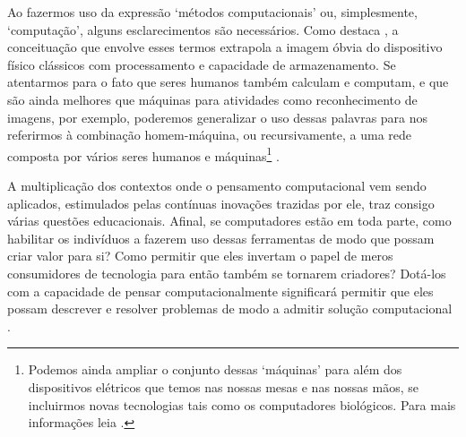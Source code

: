 
Ao fazermos uso da expressão `métodos computacionais' ou, simplesmente, `computação', alguns esclarecimentos são necessários. Como destaca , a conceituação que envolve esses termos extrapola a imagem óbvia do dispositivo físico clássicos com processamento e capacidade de armazenamento. Se atentarmos para o fato que seres humanos também calculam e computam, e que são ainda melhores que máquinas para atividades como reconhecimento de imagens, por exemplo, poderemos generalizar o uso dessas palavras para nos referirmos à combinação homem-máquina, ou recursivamente, a uma rede composta por vários seres humanos e máquinas\footnote{Podemos ainda ampliar o conjunto dessas `máquinas' para além dos dispositivos elétricos que temos nas nossas mesas e nas nossas mãos, se incluirmos novas tecnologias tais como os computadores biológicos. Para mais informações leia .} \cite{wing2008,Wing2010}.

A multiplicação dos contextos onde o pensamento computacional vem sendo aplicados, estimulados pelas contínuas inovações trazidas por ele, traz consigo várias questões educacionais. Afinal, se computadores estão em toda parte, como habilitar os indivíduos a fazerem uso dessas ferramentas de modo que possam criar valor para si? Como permitir que eles invertam o papel de meros consumidores de tecnologia para então também se tornarem criadores? Dotá-los com a capacidade de pensar computacionalmente significará permitir que eles possam descrever e resolver problemas de modo a admitir solução computacional \cite{Wing2010}. 



